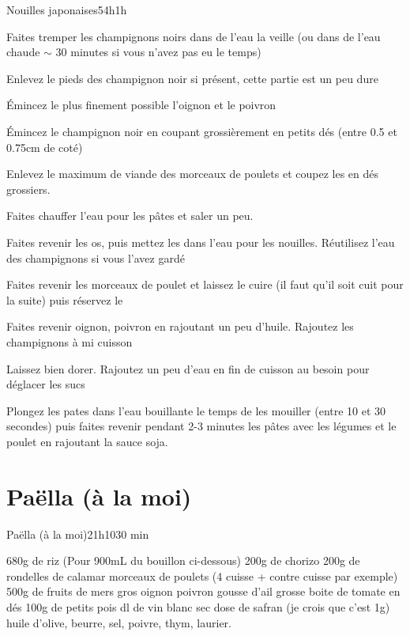 {\begin{recette}{Nouilles japonaises}{5}{4h}{1h}
\begin{preparation}
\item Faites tremper les champignons noirs dans de l'eau la veille (ou dans de l'eau chaude $\sim$ 30 minutes si vous n'avez pas eu le 
temps)
\begin{remarque}
Enlevez le pieds des champignon noir si présent, cette partie est un peu dure
\end{remarque}

\item Émincez le plus finement possible l'oignon et le poivron
\item Émincez le champignon noir en coupant grossièrement en petits dés (entre 0.5 et 0.75cm de coté)
\item Enlevez le maximum de viande des morceaux de poulets et coupez les en dés grossiers. 
\item Faites chauffer l'eau pour les pâtes et saler un peu.
\item Faites revenir les os, puis mettez les dans l'eau pour les nouilles. Réutilisez l'eau des champignons si vous l'avez gardé
\item Faites revenir les morceaux de poulet et laissez le cuire (il faut 
qu'il soit cuit pour la suite) puis réservez le
\item Faites revenir oignon, poivron en rajoutant un peu d'huile. Rajoutez les champignons à mi cuisson
\item Laissez bien dorer. Rajoutez un peu d'eau en fin de cuisson au besoin pour déglacer les sucs
\item Plongez les pates dans l'eau bouillante le temps de les mouiller (entre 10 et 30 secondes) puis faites revenir pendant 2-3 minutes les pâtes avec les 
légumes et le poulet en rajoutant la sauce soja.
\end{preparation}
\end{recette}

\section{Paëlla (à la moi)}
\begin{recette}{Paëlla (à la moi)}{2}{1h10}{30 min}
\begin{ingredients}
\ingredient 680g de riz (Pour 900mL du bouillon ci-dessous)
\ingredient 200g de chorizo
\ingredient 200g de rondelles de calamar
 morceaux de poulets (4 cuisse + contre cuisse par exemple)
\ingredient 500g de fruits de mers
 gros oignon
 poivron
 gousse d'ail
 grosse boite de tomate en dés
\ingredient 100g de petits pois
 dl de vin blanc sec
 dose de safran (je crois que c'est 1g)
\ingredient huile d'olive, beurre, sel, poivre, thym, laurier.
\end{ingredients}


\end{recette}}

